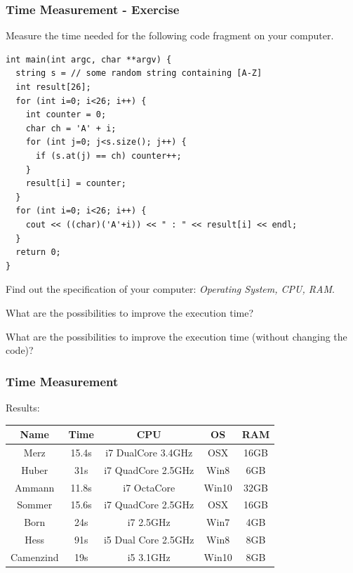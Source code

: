 \begin{frame}[fragile]
\frametitle{Time Measurement - Exercise}
{\tiny
\begin{exercise}
Measure the time needed for the following code fragment on your computer.
\begin{lstlisting}
int main(int argc, char **argv) {
  string s = // some random string containing [A-Z]
  int result[26];
  for (int i=0; i<26; i++) {
    int counter = 0;
    char ch = 'A' + i;
    for (int j=0; j<s.size(); j++) {
      if (s.at(j) == ch) counter++;
    }
    result[i] = counter;
  }
  for (int i=0; i<26; i++) {
    cout << ((char)('A'+i)) << " : " << result[i] << endl;
  }
  return 0;
}
\end{lstlisting}
\end{exercise}
\begin{exercise}
Find out the specification of your computer: \emph{Operating System, CPU, RAM}.
\end{exercise}
\begin{exercise}
What are the possibilities to improve the execution time?
\end{exercise}
\begin{exercise}
What are the possibilities to improve the execution time (without changing the code)?
\end{exercise}
}
\end{frame}

\begin{frame}[fragile]
\frametitle{Time Measurement}
Results:\\
\vspace{3mm}
\begin{tabular}{c|c|c|c|c}
Name & Time & CPU & OS & RAM\\
\hline
Merz & 15.4s & i7 DualCore 3.4GHz & OSX & 16GB\\
Huber & 31s & i7 QuadCore 2.5GHz & Win8 & 6GB\\
Ammann & 11.8s & i7 OctaCore & Win10 & 32GB\\
Sommer & 15.6s & i7 QuadCore 2.5GHz & OSX & 16GB\\
Born & 24s & i7 2.5GHz & Win7 & 4GB\\
Hess & 91s & i5 Dual Core 2.5GHz &  Win8 & 8GB\\
Camenzind & 19s & i5 3.1GHz & Win10 & 8GB
\end{tabular}
\end{frame}

